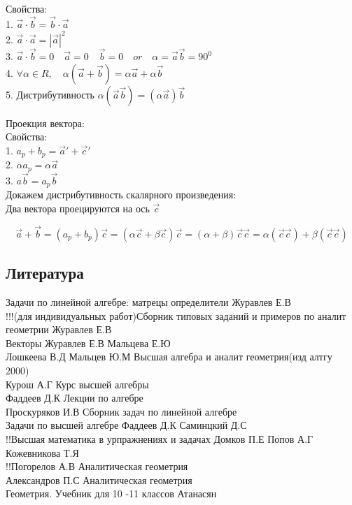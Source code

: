 \documentclass[a4paper, 12pt]{article}
\begin{document}
Свойства:\\
1. $ \vec{a} \cdot \vec{b} = \vec{b} \cdot \vec{a} $\\
2. $ \vec{a} \cdot \vec{a} = |\vec{a}|^2 $\\
3. $ \vec{a} \cdot \vec{b} = 0 \quad \vec{a} = 0 \quad \vec{b} = 0 \quad or \quad \alpha = \vec{a}  \vec{b} = 90^0 $ \\
4. $ \forall \alpha \in R, \quad \alpha(\vec{a}+ \vec{b}) = \alpha \vec{a} + \alpha \vec{b}$\\
5. Дистрибутивность $ \alpha(\vec{a}\vec{b}) = (\alpha \vec{a}) \vec{b}$

Проекция вектора:\\
Свойства:\\
1. $ a_p + b_p = \vec{a}' + \vec{c}' $\\
2. $ \alpha a_p = \alpha \vec{a} $\\
3. $ a \vec{b} = a_p \vec{b} $\\

\newpage
Докажем дистрибутивность скалярного произведения:\\
Два вектора проецируются на ось $ \vec{c} $
\begin{mdframed}[backgroundcolor=blue!20] 
\[
	\vec{a} + \vec{b} = (a_p + b_p)\vec{c}=(\alpha \vec{c} + \beta \vec{c})\vec{c} = (\alpha + \beta)\vec{c}\vec{c} = \alpha(\vec{c}\vec{c})+ \beta(\vec{c}\vec{c})	
\]
\end{mdframed}




\newpage
\subsection*{Литература}
Задачи по линейной алгебре: матрецы определители Журавлев Е.В\\
!!!(для индивидуальных работ)Сборник типовых заданий и примеров по аналит геометрии Журавлев Е.В\\
Векторы Журавлев Е.В Мальцева Е.Ю\\
Лошкеева В.Д Мальцев Ю.М Высшая алгебра и аналит геометрия(изд алтгу 2000)\\
Курош А.Г Курс высшей алгебры\\
Фаддеев Д.К Лекции по алгебре\\
Проскуряков И.В Сборник задач по линейной алгебре\\
Задачи по высшей алгебре Фаддеев Д.К Саминцкий Д.С\\
!!Высшая математика в урпражнениях и задачах Домков П.Е Попов А.Г Кожевникова Т.Я\\
!!Погорелов А.В Аналитическая геометрия\\
Александров П.С Аналитическая геометрия\\
Геометрия. Учебник для 10 -11 классов Атанасян\\
\end{document}
